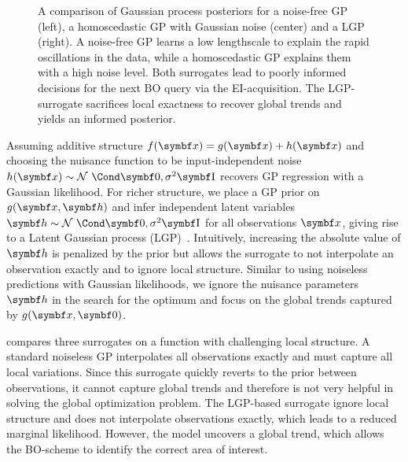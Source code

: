 \begin{figure}[t]
    \centering
    \caption[Comparison of BO surrogates]{
        \label{fig:bo:posterior}
        A comparison of Gaussian process posteriors for a noise-free GP (left), a homoscedastic GP with Gaussian noise (center) and a LGP (right).
        A noise-free GP learns a low lengthscale to explain the rapid oscillations in the data, while a homoscedastic GP explains them with a high noise level.
        Both surrogates lead to poorly informed decisions for the next BO query via the EI-acquisition.
        The LGP-surrogate sacrifices local exactness to recover global trends and yields an informed posterior.
    }
\end{figure}
Assuming additive structure $f(\mat{x}) = g(\mat{x}) + h(\mat{x})$ and choosing the nuisance function to be input-independent noise $h(\mat{x}) \sim \Gaussian{\mat{0}, \sigma^2 \Eye}$ recovers GP regression with a Gaussian likelihood.
For richer structure, we place a GP prior on $g(\mat{x}, \mat{h})$ and infer independent latent variables $\mat{h} \sim \Gaussian{\mat{0}, \sigma^2 \Eye}$ for all observations $\mat{x}$, giving rise to a Latent Gaussian process (LGP)~\parencite{pfingsten_nonstationary_2006,wang_gaussian_2012,yousefi_unsupervised_2016,bodin_latent_2017}.
Intuitively, increasing the absolute value of $\mat{h}$ is penalized by the prior but allows the surrogate to not interpolate an observation exactly and to ignore local structure.
Similar to using noiseless predictions with Gaussian likelihoods, we ignore the nuisance parameters $\mat{h}$ in the search for the optimum and focus on the global trends captured by $g(\mat{x}, \mat{0})$.

 compares three surrogates on a function with challenging local structure.
A standard noiseless GP interpolates all observations exactly and must capture all local variations.
Since this surrogate quickly reverts to the prior between observations, it cannot capture global trends and therefore is not very helpful in solving the global optimization problem.
The LGP-based surrogate ignore local structure and does not interpolate observations exactly, which leads to a reduced marginal likelihood.
However, the model uncovers a global trend, which allows the BO-scheme to identify the correct area of interest.

